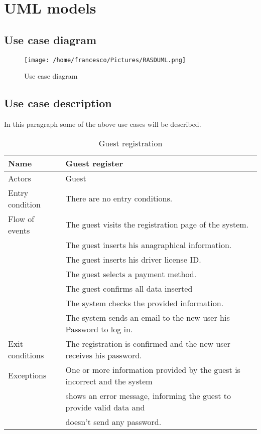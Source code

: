 \documentclass[10pt, a4paper,titlepage]{article}
\begin{document}
\section{UML models}
\subsection{Use case diagram}
\begin{figure}[!h]
\texttt{[image: /home/francesco/Pictures/RASDUML.png]}
\caption{Use case diagram}
\label{fig:use case}
\end{figure}
\newpage
\subsection{Use case description}
In this paragraph some of the above use cases will be described.
\begin{table}[h]
\caption{Guest registration} \label{tab:scenario1}
\begin{tabular}{|l|l|}
\hline
Name & Guest register \\
\hline
Actors & Guest \\
\hline
Entry condition & There are no entry conditions. \\
\hline
Flow of events & The guest visits the registration page of the system. \\
& The guest inserts his anagraphical information.\\
& The guest inserts his driver license ID.\\
& The guest selects a payment method.\\
& The guest confirms all data inserted\\
& The system checks the provided information.\\
& The system sends an email to the new user his Password to log in.\\
\hline
Exit conditions & The registration is confirmed and the new user receives his password. \\
\hline
Exceptions & One or more information provided by the guest is incorrect and the system \\
& shows an error message, informing the guest to provide valid data and \\
& doesn't send any password.\\
\hline
\end{tabular}
\end{table}
\end{document}
